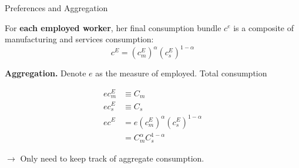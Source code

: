 \documentclass[9pt,xcolor={svgnames}]{beamer}
\begin{document}
\begin{frame}{Preferences and Aggregation} \label{app:proof}

  For \textbf{each employed worker}, her final consumption bundle $c^e$ is a composite of manufacturing and services consumption:
\begin{equation*}
    c^E = (c^E_m)^{\alpha} (c^E_s)^{1-\alpha}
    \label{eq:ce}
\end{equation*}



\textbf{Aggregation.} Denote $e$ as the measure of employed. Total consumption 

\begin{align*}
     e c_m^E & \equiv C_m \\
     e c_s^E &\equiv C_s \\
    ec^E &= e   (c^E_m)^{\alpha} (c^E_s)^{1-\alpha}\\
     & =  C_m^{\alpha} C_s^{1-\alpha}
\end{align*}

$\rightarrow $  Only need to keep track of aggregate consumption. 

  \hyperlink{main:preference}{}
\end{frame}
\end{document}
